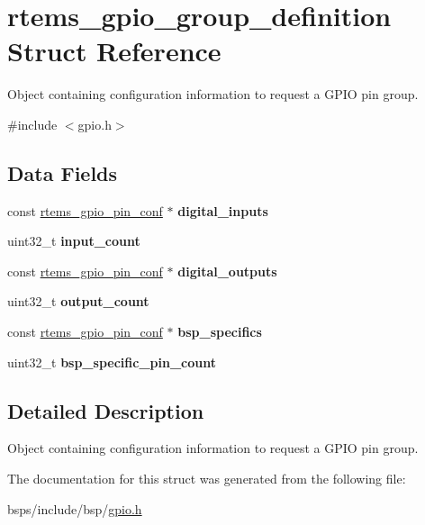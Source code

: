 \hypertarget{structrtems__gpio__group__definition}{}\section{rtems\+\_\+gpio\+\_\+group\+\_\+definition Struct Reference}
\label{structrtems__gpio__group__definition}


Object containing configuration information to request a G\+P\+IO pin group.  




{\ttfamily \#include $<$gpio.\+h$>$}

\subsection*{Data Fields}
\begin{DoxyCompactItemize}
\item 
\mbox{\label{structrtems__gpio__group__definition_aeb89c1c6f2799f8384d0d442ae48e605}} 
const \mbox{\hyperlink{structrtems__gpio__pin__conf}{rtems\+\_\+gpio\+\_\+pin\+\_\+conf}} $\ast$ {\bfseries digital\+\_\+inputs}
\item 
\mbox{\label{structrtems__gpio__group__definition_af6f341380522da6b073a7a08d4cdb61b}} 
uint32\+\_\+t {\bfseries input\+\_\+count}
\item 
\mbox{\label{structrtems__gpio__group__definition_a8d46d8362d98210762217e43d4e9c743}} 
const \mbox{\hyperlink{structrtems__gpio__pin__conf}{rtems\+\_\+gpio\+\_\+pin\+\_\+conf}} $\ast$ {\bfseries digital\+\_\+outputs}
\item 
\mbox{\label{structrtems__gpio__group__definition_ad32348e2287b6b8133f5cadd1ae5d4ce}} 
uint32\+\_\+t {\bfseries output\+\_\+count}
\item 
\mbox{\label{structrtems__gpio__group__definition_adffc94ca4b5a1a6b1f42b943d448f826}} 
const \mbox{\hyperlink{structrtems__gpio__pin__conf}{rtems\+\_\+gpio\+\_\+pin\+\_\+conf}} $\ast$ {\bfseries bsp\+\_\+specifics}
\item 
\mbox{\label{structrtems__gpio__group__definition_ab77d90201e0ea30e170a91fffe2348c8}} 
uint32\+\_\+t {\bfseries bsp\+\_\+specific\+\_\+pin\+\_\+count}
\end{DoxyCompactItemize}


\subsection{Detailed Description}
Object containing configuration information to request a G\+P\+IO pin group. 

The documentation for this struct was generated from the following file\+:\begin{DoxyCompactItemize}
\item 
bsps/include/bsp/\mbox{\hyperlink{gpio_8h}{gpio.\+h}}\end{DoxyCompactItemize}
